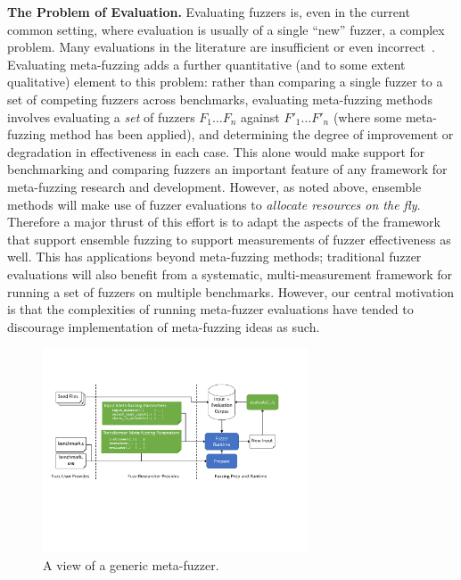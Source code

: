 \vspace{1ex}
\noindent\textbf{The Problem of Evaluation.} Evaluating fuzzers is, even in the 
current common setting, where evaluation is usually of a single ``new'' fuzzer, 
a complex problem. Many evaluations in the literature are insufficient or even 
incorrect~\cite{FuzzerHicks}.  Evaluating meta-fuzzing adds a further quantitative (and to some 
extent qualitative) element to this problem: rather than comparing a single 
fuzzer to a set of competing fuzzers across benchmarks, evaluating meta-fuzzing 
methods involves evaluating a \emph{set} of fuzzers $F_1 \ldots F_n$ against 
$F'_1 \ldots F'_n$ (where some meta-fuzzing method has been applied), and 
determining the degree of improvement or degradation in effectiveness in each 
case.  This alone would make support for benchmarking and comparing fuzzers an 
important feature of any framework for meta-fuzzing research and development.  
However, as noted above, ensemble methods will  make use of 
fuzzer evaluations to \emph{allocate resources on the fly}.  Therefore a major thrust of this 
effort is to adapt the aspects of the framework that support ensemble fuzzing 
to support measurements of fuzzer effectiveness as well.  This has applications beyond meta-fuzzing methods; traditional fuzzer 
evaluations will also  benefit from a systematic, 
multi-measurement framework for running a set of fuzzers on multiple
benchmarks.  However, our central motivation is that the complexities of running
meta-fuzzer evaluations have tended to discourage implementation of
meta-fuzzing ideas as such.


\begin{figure}
\centering
\includegraphics[width=0.7\textwidth,trim={0.3in 3.0in 1.2in 1.4in},clip]{figures/fuzzer-arch.pdf}
\caption{A view of a generic meta-fuzzer.}
\label{fig:meta}
\end{figure}

